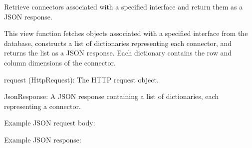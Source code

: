 \documentclass[letterpaper,10pt,english]{sphinxmanual}
\begin{document}

\begin{fulllineitems}
\label{\detokenize{app:app.views.get_connecteur}}
\pysigstartsignatures
{}
\pysigstopsignatures
\sphinxAtStartPar
Retrieve connectors associated with a specified interface and return them as a JSON response.

\sphinxAtStartPar
This view function fetches  objects associated with a specified interface from 
the database, constructs a list of dictionaries representing each connector, and returns 
the list as a JSON response. Each dictionary contains the row and column dimensions of the connector.
\begin{description}
\sphinxAtStartPar
request (HttpRequest): The HTTP request object.

\sphinxAtStartPar
JsonResponse: A JSON response containing a list of dictionaries, each representing a connector.

\sphinxAtStartPar
Example JSON request body:

\begin{sphinxVerbatim}[commandchars=\\\{\}]
\end{sphinxVerbatim}

\sphinxAtStartPar
Example JSON response:

\begin{sphinxVerbatim}[commandchars=\\\{\}]
\PYG{p}{[}
\PYG{p}{]}
\end{sphinxVerbatim}


\end{description}
\end{fulllineitems}
\end{document}
